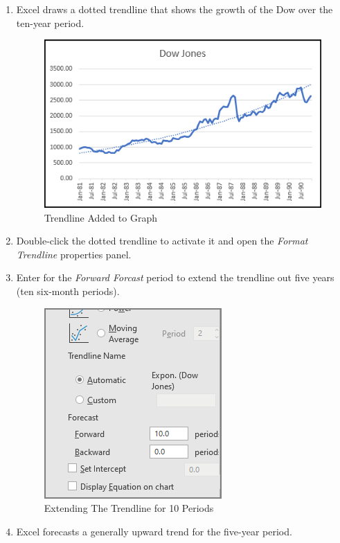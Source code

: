 \begin{enumerate}
	\item Excel draws a dotted trendline that shows the growth of the Dow over the ten-year period.

	\begin{figure}[H]
		\centering
		\includegraphics[width=\maxwidth{.95\linewidth}]{gfx/ch08_fig08}
		\caption{Trendline Added to Graph}
		\label{08:fig08}
	\end{figure}

	\item Double-click the dotted trendline to activate it and open the \textit{Format Trendline} properties panel.
	\item Enter  for the \textit{Forward Forcast} period to extend the trendline out five years (ten six-month periods).

	\begin{figure}[H]
		\centering
		\includegraphics[width=\maxwidth{.50\linewidth}]{gfx/ch08_fig09}
		\caption{Extending The Trendline for 10 Periods}
		\label{08:fig09}
	\end{figure}

	\item Excel forecasts a generally upward trend for the five-year period.


\end{enumerate}
